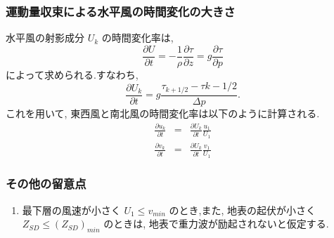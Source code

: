 \subsubsection{運動量収束による水平風の時間変化の大きさ}

水平風の射影成分 $U_{k}$ の時間変化率は,
\begin{equation}
  \frac{\partial U}{\partial t} 
        = - \frac{1}{\rho} \frac{\partial \tau}{\partial z}
        = g  \frac{\partial \tau}{\partial p}
\end{equation}
%
によって求められる.すなわち,
%
\begin{equation}
  \frac{\partial U_{k}}{\partial t} 
        =  g  \frac{\tau_{k+1/2} - \tau{k-1/2}}{\Delta p}.
\end{equation}
%
これを用いて,
東西風と南北風の時間変化率は以下のように計算される.
\begin{eqnarray}
  \frac{\partial u_{k}}{\partial t} & = &
           \frac{\partial U_{k}}{\partial t} \frac{u_{1}}{U_{1}} \\
  \frac{\partial v_{k}}{\partial t} & = &
           \frac{\partial U_{k}}{\partial t} \frac{v_{1}}{U_{1}}
\end{eqnarray}

\subsubsection{その他の留意点}

\begin{enumerate}
\item 最下層の風速が小さく $U_{1} \le v_{min}$ のとき,また,
      地表の起伏が小さく $Z_{SD} \le (Z_{SD})_{min}$ のときは, 
      地表で重力波が励起されないと仮定する.
\end{enumerate}

